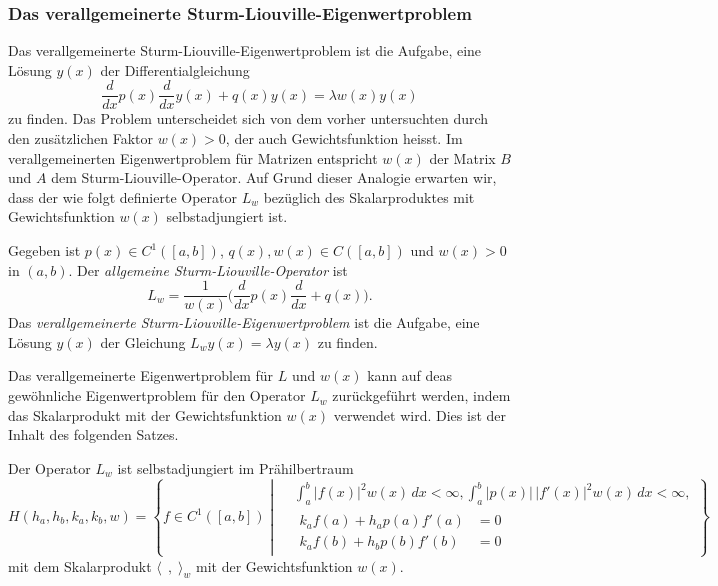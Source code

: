 %
%
\subsubsection{Das verallgemeinerte Sturm-Liouville-Eigenwertproblem}
Das verallgemeinerte Sturm-Liouville-Eigenwertproblem ist die Aufgabe,
eine Lösung $y(x)$ der Differentialgleichung
\[
\frac{d}{dx}p(x)\frac{d}{dx} y(x)
+ q(x)y(x)
=
\lambda w(x) y(x)
\]
zu finden.
Das Problem unterscheidet sich von dem vorher untersuchten durch
den zusätzlichen Faktor $w(x)>0$, der auch Gewichtsfunktion heisst.
Im verallgemeinerten Eigenwertproblem für Matrizen entspricht $w(x)$ 
der Matrix $B$ und $A$ dem Sturm-Liouville-Operator.
Auf Grund dieser Analogie erwarten wir, dass der wie folgt
definierte Operator $L_w$ bezüglich des Skalarproduktes mit Gewichtsfunktion
$w(x)$ selbstadjungiert ist.

\begin{definition}
Gegeben ist $p(x)\in C^1([a,b])$, $q(x),w(x)\in C([a,b])$ und $w(x)>0$
in $(a,b)$.
Der {\em allgemeine Sturm-Liouville-Operator} ist
\[
L_w
=
\frac{1}{w(x)}
\biggl(
\frac{d}{dx}p(x)\frac{d}{dx}
+
q(x)
\biggr).
\]
Das {\em verallgemeinerte Sturm-Liouville-Eigenwertproblem} ist die Aufgabe,
eine Lösung $y(x)$ der Gleichung
\(
L_wy(x) = \lambda y(x)
\)
zu finden.
\end{definition}

Das verallgemeinerte Eigenwertproblem für $L$ und $w(x)$ kann auf
deas gewöhnliche Eigenwertproblem für den Operator $L_w$ 
zurückgeführt werden, indem das Skalarprodukt mit der Gewichtsfunktion
$w(x)$ verwendet wird.
Dies ist der Inhalt des folgenden Satzes.

\begin{satz}
Der Operator $L_w$ ist selbstadjungiert im Prähilbertraum
\[
H(h_a,h_b,k_a,k_b,w)
=
\left\{
f \in C^1([a,b])
\;
\left|
\;
\begin{aligned}
&\int_a^b |f(x)|^2w(x)\,dx < \infty,
\int_a^b |p(x)|\, |f'(x)|^2w(x)\,dx < \infty,
\\
&
\begin{aligned}
k_af(a) + h_ap(a)f'(a) &= 0 \\
k_af(b) + h_bp(b)f'(b) &= 0 
\end{aligned}
\end{aligned}
\right.
\right\}
\]
mit dem Skalarprodukt $\langle \;\,,\;\rangle_w$ mit der Gewichtsfunktion
$w(x)$.
\end{satz}

